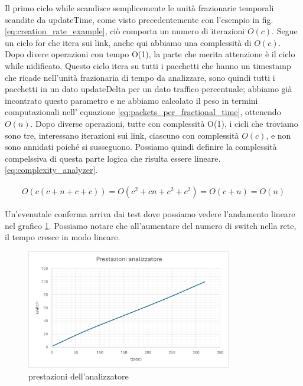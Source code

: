 \documentclass[binding=0.6cm]{sapthesis}
\begin{document}
Il primo ciclo while scandisce semplicemente le unità frazionarie temporali scandite da updateTime, come visto precedentemente con l'esempio in fig. \ref{eq:creation_rate_example}, ciò comporta un numero di iterazioni \(O(c)\).
Segue un ciclo for che itera sui link, anche qui abbiamo una complessità di \(O(c)\). Dopo divere operazioni con tempo O(1), la parte che merita attenzione è il ciclo while nidificato.
Questo ciclo itera su tutti i pacchetti che hanno un timestamp che ricade nell'unità frazionaria di tempo da analizzare, sono quindi tutti i pacchetti in un dato updateDelta per un dato traffico percentuale; abbiamo già incontrato questo
parametro e ne abbiamo calcolato il peso in termini computazionali nell' equazione \ref{eq:packets_per_fractional_time}, ottenendo \(O(n)\). Dopo diverse
operazioni, tutte con complessità O(1), i cicli che troviamo sono tre, interessano iterazioni sui link, ciascuno con complessità \(O(c)\), e non sono annidati poiché si susseguono.
Possiamo quindi definire la complessità compelssiva di questa parte logica che risulta essere lineare. \ref{eq:complexity_analyzer}.


\begin{align}
    O(c(c+n+c+c)) = O(c^2 + cn + c^2 + c^2) = O(c + n) = O(n)
    \label{eq:complexity_analyzer}
\end{align}

Un'evenutale conferma arriva dai test dove possiamo vedere l'andamento lineare nel grafico \ref{fig:prestazioni_analizzatore}. Possiamo
notare che all'aumentare del numero di switch nella rete, il tempo cresce in modo lineare.

\begin{figure}[h]
    \centering
    \includegraphics[width=0.8\textwidth]{immagini/prestazioni_analyzer.png}
    \caption{prestazioni dell'analizzatore}
    \label{fig:prestazioni_analizzatore}
\end{figure}
\end{document}
